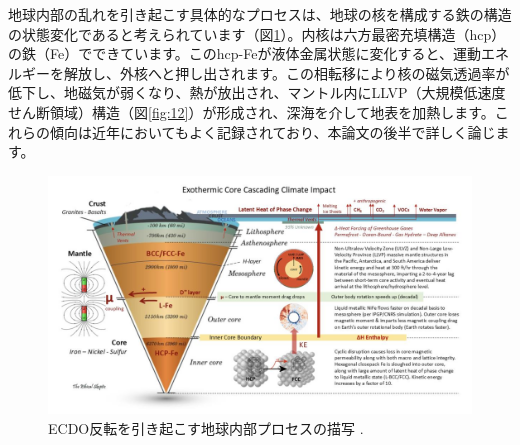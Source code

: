 \documentclass[10pt,twocolumn,letterpaper]{article}
\begin{document}
地球内部の乱れを引き起こす具体的なプロセスは、地球の核を構成する鉄の構造の状態変化であると考えられています（図\ref{fig:11}）。内核は六方最密充填構造（hcp）の鉄（Fe）でできています\cite{141}。このhcp-Feが液体金属状態に変化すると、運動エネルギーを解放し、外核へと押し出されます。この相転移により核の磁気透過率が低下し、地磁気が弱くなり、熱が放出され、マントル内にLLVP（大規模低速度せん断領域）構造（図\ref{fig:12}）\cite{38}が形成され、深海を介して地表を加熱します。これらの傾向は近年においてもよく記録されており、本論文の後半で詳しく論じます。

\begin{figure}[t]
\begin{center}
\includegraphics[width=1\textwidth]{layers.jpg}
\end{center}

   \caption{ECDO反転を引き起こす地球内部プロセスの描写 \cite{129}.}
\label{fig:11}
\end{figure}

\end{document}
